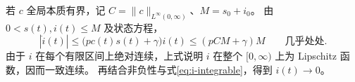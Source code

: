 若 $c$ 全局本质有界，记
$C=\|c\|_{L^\infty(0,\infty)}$、$M=s_0+i_0$。
由 $0<s(t),i(t)\le M$ 及状态方程，
\[
 |\dot i(t)|
 \le \bigl(pc(t)s(t)+\gamma\bigr)i(t)
 \le (pCM+\gamma)M
 \qquad\text{几乎处处}.
\]
由于 $i$ 在每个有限区间上绝对连续，上式说明 $i$ 在整个
$[0,\infty)$ 上为 Lipschitz 函数，因而一致连续。
再结合非负性与式\eqref{eq:i-integrable}，得到 $i(t)\to0$。
